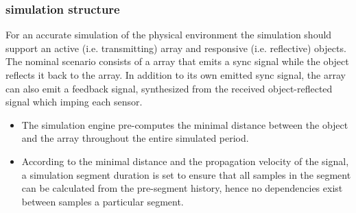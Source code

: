 \documentclass[12pt]{article}
\begin{document}
\subsubsection{simulation structure}
For an accurate simulation of the physical environment the simulation should support an active (i.e. transmitting) array and responsive (i.e. reflective) objects. The nominal scenario consists of a array that emits a sync signal while the object reflects it back to the array. In addition to its own emitted sync signal, the array can also emit a feedback signal, synthesized from the received object-reflected signal which imping each sensor. 
\begin{itemize}
\item{
The simulation engine pre-computes the minimal distance between the object and the array throughout the entire simulated period.
}
\item{
According to the minimal distance and the propagation velocity of the signal, a simulation segment duration is set to ensure that all samples in the segment can be calculated from the pre-segment history, hence no dependencies exist between samples a particular segment.
}
\end{itemize}
\clearpage
\small
{


}
\end{document}
